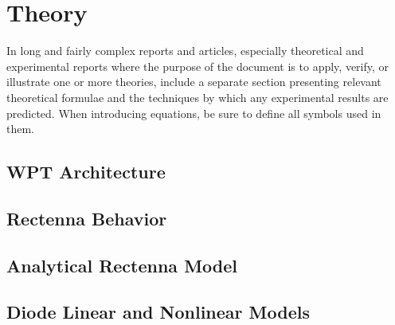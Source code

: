 \chapter{Theory}
In long and fairly complex reports and articles, especially theoretical and experimental reports where the purpose of the document is to apply, verify, or illustrate one or more theories, include a separate section presenting relevant theoretical formulae and the techniques by which any experimental results are predicted. When introducing equations, be sure to define all symbols used in them.


\section{WPT Architecture}
  

\section{Rectenna Behavior}
  

\section{Analytical Rectenna Model}
  

\section{Diode Linear and Nonlinear Models}
  
